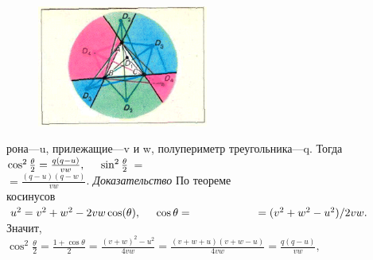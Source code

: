 \begin{multicols}{2}
\begin{figure}[H]
\includegraphics[width = 0.5\textwidth]{pic_1}
\caption{}
\label{f:pic1}
\end{figure}

рона—u, прилежащие—v и w, полупериметр треугольника—q. Тогда
$\cos^2{\frac{\theta}{2}}=\frac{q(q-u)}{vw},\-\hspace{0.5cm} \sin^2{\frac{\theta}{2}}$ =\\\-\hspace{3.8cm} $=\frac{(q-u)(q-w)}{vw}$.
\textit{Доказательство}\-\hspace{1cm}  По теореме\\ косинусов\\
$u^2=v^2+w^2-2vw\cos(\theta),\-\hspace{0.5cm} \cos{\theta}=\\
\-\hspace{2cm} =(v^2+w^2-u^2)/2vw.$\\
Значит,\\
\large
$\cos^2{\frac{\theta}{2}}=\frac{1+\cos{\theta}}{2}=\frac{(v+w)^2-u^2}{4vw}=\frac{(v+w+u)(v+w-u)}{4vw}=\frac{q(q-u)}{vw},$

\vspace*{10mm}

\end{multicols}

